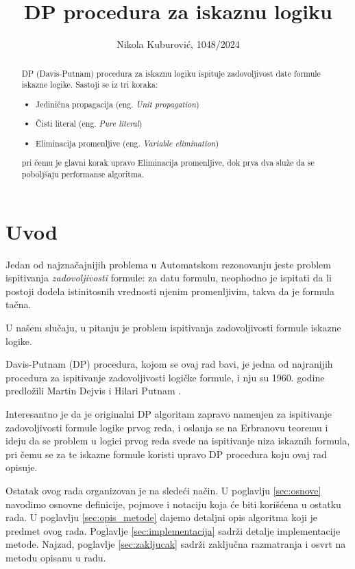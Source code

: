 \documentclass[a4paper,10pt]{article}
\title{DP procedura za iskaznu logiku}
\author{Nikola Kuburović, 1048/2024}
\begin{document}
\maketitle

\begin{abstract}
  DP (Davis-Putnam) procedura za iskaznu logiku ispituje zadovoljivost date formule iskazne logike.
  Sastoji se iz tri koraka:
  \begin{itemize}
    \item Jedinična propagacija (eng. \emph{Unit propagation})
    \item Čisti literal (eng. \emph{Pure literal})
    \item Eliminacija promenljive (eng. \emph{Variable elimination})
  \end{itemize}
  pri čemu je glavni korak upravo Eliminacija promenljive, dok prva dva služe da se poboljšaju performanse algoritma.
\end{abstract}

\section{Uvod}
Jedan od najznačajnijih problema u Automatskom rezonovanju jeste problem ispitivanja \emph{zadovoljivosti} formule:
za datu formulu, neophodno je ispitati da li postoji dodela istinitosnih vrednosti njenim promenljivim, takva da je formula tačna.

U našem slučaju, u pitanju je problem ispitivanja
zadovoljivosti formule iskazne logike.

Davis-Putnam (DP) procedura, kojom se ovaj rad bavi,
je jedna od najranijih procedura za ispitivanje zadovoljivosti logičke formule, i nju su 1960. godine
predložili Martin Dejvis i Hilari Putnam \cite{davis_putnam}.

Interesantno je da je originalni DP algoritam zapravo namenjen za ispitivanje zadovoljivosti formule logike prvog reda, i oslanja se na Erbranovu teoremu i ideju
da se problem u logici prvog reda svede na ispitivanje
niza iskaznih formula, pri čemu se za te iskazne formule koristi upravo DP procedura koju ovaj rad opisuje.

Ostatak ovog rada organizovan je na sledeći način. U poglavlju \ref{sec:osnove} navodimo osnovne definicije, pojmove i notaciju koja će biti korišćena u ostatku rada. U poglavlju \ref{sec:opis_metode} dajemo detaljni opis algoritma koji je predmet ovog rada. Poglavlje \ref{sec:implementacija} sadrži detalje implementacije metode. Najzad, poglavlje \ref{sec:zakljucak} sadrži zaključna razmatranja i osvrt na metodu opisanu u radu.
\end{document}
